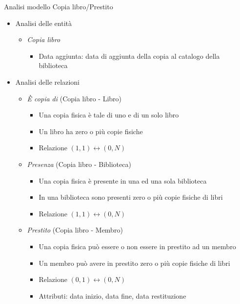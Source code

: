 \begin{frame}{Analisi modello Copia libro/Prestito}
    \begin{itemize}
        \item Analisi delle entità
            \begin{itemize}
                \item \textit{Copia libro}
                    \begin{itemize}
                        \item Data aggiunta: data di aggiunta della copia al catalogo della biblioteca
                    \end{itemize}
            \end{itemize}
        \item Analisi delle relazioni
            \begin{itemize}
                \item \textit{È copia di} (Copia libro - Libro)
                    \begin{itemize}
                        \item Una copia fisica è tale di uno e di un solo libro
                        \item Un libro ha zero o più copie fisiche
                        \item Relazione $(1,1) \leftrightarrow (0,N)$
                    \end{itemize}
                \item \textit{Presenza} (Copia libro - Biblioteca)
                    \begin{itemize}
                        \item Una copia fisica è presente in una ed una sola biblioteca
                        \item In una biblioteca sono presenti zero o più copie fisiche di libri
                        \item Relazione $(1,1) \leftrightarrow (0,N)$
                    \end{itemize}
                \item \textit{Prestito} (Copia libro - Membro)
                    \begin{itemize}
                        \item Una copia fisica può essere o non essere in prestito ad un membro
                        \item Un membro può avere in prestito zero o più copie fisiche di libri
                        \item Relazione $(0,1) \leftrightarrow (0,N)$
                        \item Attributi: data inizio, data fine, data restituzione
                    \end{itemize}
            \end{itemize}
    \end{itemize}
\end{frame}

